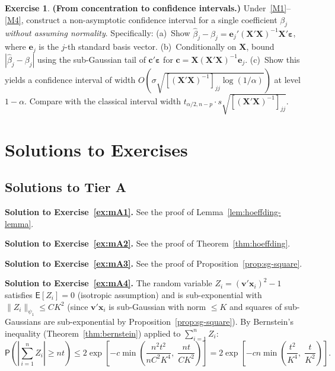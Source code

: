 \documentclass[14pt]{extarticle}
\theoremstyle{plain}
\theoremstyle{definition}
\newtheorem{exercise}{Exercise}[section]
\theoremstyle{remark}
\newcommand\expc{\mathsf{E}}
\newcommand\prb{\mathsf{P}}
\newcommand{\bX}{\mathbf{X}}
\newcommand{\bx}{\mathbf{x}}
\newcommand{\be}{\boldsymbol{\varepsilon}}
\def\bc{\mathbf{c}}
\newcommand{\bv}{\mathbf{v}}
\begin{document}
\begin{exercise}\label{ex:mC4}
\textbf{(From concentration to confidence intervals.)} Under~\ref{M1}--\ref{M4}, construct a non-asymptotic confidence interval for a single coefficient $\beta_j$ \emph{without assuming normality}. Specifically: (a)~Show $\hat\beta_j - \beta_j = \mathbf{e}_j'(\bX'\bX)^{-1}\bX'\be$, where $\mathbf{e}_j$ is the $j$-th standard basis vector. (b)~Conditionally on $\bX$, bound $|\hat\beta_j - \beta_j|$ using the sub-Gaussian tail of $\bc'\be$ for $\bc = \bX(\bX'\bX)^{-1}\mathbf{e}_j$. (c)~Show this yields a confidence interval of width $O(\sigma\sqrt{[(\bX'\bX)^{-1}]_{jj}\log(1/\alpha)})$ at level $1-\alpha$. Compare with the classical interval width $t_{\alpha/2, n-p}\cdot s\sqrt{[(\bX'\bX)^{-1}]_{jj}}$.
\end{exercise}

\section{Solutions to Exercises}\label{sec:modern-solutions}

\subsection*{Solutions to Tier A}

\textbf{Solution to Exercise~\ref{ex:mA1}.} See the proof of Lemma~\ref{lem:hoeffding-lemma}.

\textbf{Solution to Exercise~\ref{ex:mA2}.} See the proof of Theorem~\ref{thm:hoeffding}.

\textbf{Solution to Exercise~\ref{ex:mA3}.} See the proof of Proposition~\ref{prop:sg-square}.

\textbf{Solution to Exercise~\ref{ex:mA4}.} The random variable $Z_i = (\bv'\bx_i)^2 - 1$ satisfies $\expc[Z_i] = 0$ (isotropic assumption) and is sub-exponential with $\|Z_i\|_{\psi_1} \leqslant CK^2$ (since $\bv'\bx_i$ is sub-Gaussian with norm $\leqslant K$ and squares of sub-Gaussians are sub-exponential by Proposition~\ref{prop:sg-square}). By Bernstein's inequality (Theorem~\ref{thm:bernstein}) applied to $\sum_{i=1}^n Z_i$:
\[
\prb\!\left(\left|\sum_{i=1}^n Z_i\right| \geqslant nt\right) \leqslant 2\exp\!\left[-c\min\!\left(\frac{n^2t^2}{nC^2K^4},\; \frac{nt}{CK^2}\right)\right] = 2\exp\!\left[-cn\min\!\left(\frac{t^2}{K^4},\; \frac{t}{K^2}\right)\right].
\]
\end{document}
